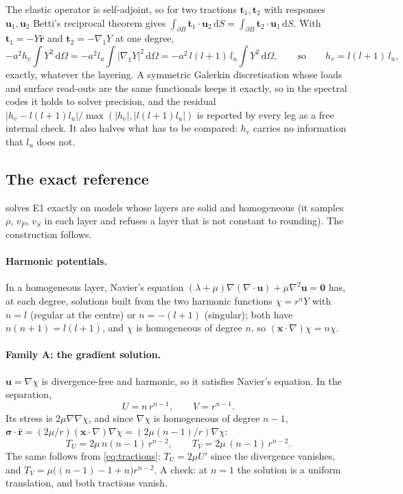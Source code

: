 \documentclass[11pt]{article}
\numberwithin{equation}{section}
\newcommand{\dS}{\,\mathrm{d}S}
\newcommand{\vu}{\mathbf{u}}
\newcommand{\vx}{\mathbf{x}}
\newcommand{\vt}{\mathbf{t}}
\newcommand{\rhat}{\hat{\mathbf{r}}}
\newcommand{\gradone}{\nabla_{1}}
\newcommand{\bsig}{\bm{\sigma}}
\begin{document}
The elastic operator is self-adjoint, so for two tractions $\vt_1,\vt_2$
with responses $\vu_1,\vu_2$ Betti's reciprocal theorem gives
$\int_{\partial B}\vt_1\cdot\vu_2\dS = \int_{\partial B}\vt_2\cdot\vu_1\dS$.
With $\vt_1=-Y\rhat$ and $\vt_2=-\gradone Y$ at one degree,
\begin{equation}
  -a^2 h_v\!\int Y^2\,\mathrm{d}\Omega
  = -a^2 l_u\!\int |\gradone Y|^2\,\mathrm{d}\Omega
  = -a^2\, l(l+1)\, l_u\!\int Y^2\,\mathrm{d}\Omega ,
  \qquad\text{so}\qquad
  h_v = l(l+1)\,l_u ,
  \label{eq:reciprocity}
\end{equation}
exactly, whatever the layering. A symmetric Galerkin discretisation whose
loads and surface read-outs are the same functionals keeps it exactly, so in
the spectral codes it holds to solver precision, and the residual
$|h_v - l(l+1)l_u|/\max(|h_v|,|l(l+1)l_u|)$ is reported by every leg as a
free internal check. It also halves what has to be compared: $h_v$ carries
no information that $l_u$ does not.

\subsection{The exact reference}
\label{sec:e1-exact}

 solves E1 exactly on models whose
layers are solid and homogeneous (it samples $\rho$, $v_P$, $v_S$ in each
layer and refuses a layer that is not constant to rounding). The
construction follows.

\paragraph{Harmonic potentials.}
In a homogeneous layer, Navier's equation
$(\lambda+\mu)\nabla(\nabla\cdot\vu)+\mu\nabla^2\vu=\mathbf 0$ has, at
each degree, solutions built from the two harmonic functions
$\chi = r^{n}Y$ with $n=l$ (regular at the centre) or $n=-(l+1)$
(singular); both have $n(n+1)=l(l+1)$, and $\chi$ is homogeneous of degree
$n$, so $(\vx\cdot\nabla)\chi = n\chi$.

\paragraph{Family A: the gradient solution.} $\vu=\nabla\chi$ is
divergence-free and harmonic, so it satisfies Navier's equation. In the
separation,
\begin{equation}
  U = n\,r^{n-1},\qquad V = r^{n-1}.
\end{equation}
Its stress is $2\mu\nabla\nabla\chi$, and since $\nabla\chi$ is homogeneous
of degree $n-1$, $\bsig\cdot\rhat = (2\mu/r)(\vx\cdot\nabla)\nabla\chi =
(2\mu(n-1)/r)\nabla\chi$:
\begin{equation}
  T_U = 2\mu\,n(n-1)\,r^{n-2},\qquad T_V = 2\mu\,(n-1)\,r^{n-2}.
  \label{eq:familyA}
\end{equation}
The same follows from \eqref{eq:tractions}: $T_U = 2\mu U'$ since the
divergence vanishes, and $T_V = \mu\bigl((n-1) - 1 + n\bigr)r^{n-2}$. A
check: at $n=1$ the solution is a uniform translation, and both tractions
vanish.
\end{document}
